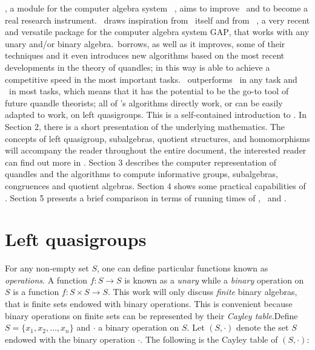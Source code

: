 \documentclass{mcom-l}
\begin{document}
\Software, a module for the computer algebra system \magma~\cite{BOSMA1997235}, aims to improve \rig~and to become a real research instrument. \Software~draws inspiration from \rig~itself and from \cream~\cite{Araujo2022CREAMAP}, a very recent and versatile package for the computer algebra system \textsc{GAP}, that works with any unary and/or binary algebra.\newline \Software~borrows, as well as it improves, some of their techniques and it even introduces new algorithms based on the most recent developments in the theory of quandles; in this way is able to achieve a competitive speed in the most important tasks. \Software~outperforms \rig~in any task and \cream~in most tasks, which means that it has the potential to be the go-to tool of future quandle theorists; all of \Software's algorithms directly work, or can be easily adapted to work, on left quasigroups. \newline This is a self-contained introduction to \Software. In Section 2, there is a short presentation of the underlying mathematics. The concepts of left quasigroup, subalgebras, quotient structures, and homomorphisms will accompany the reader throughout the entire document, the interested reader can find out more in \cite{burris1981course, elhamdadi2015quandles, phdStanov}. Section 3 describes the computer representation of quandles and the algorithms to compute informative groups, subalgebras, congruences and quotient algebras. Section 4 shows some practical capabilities of \Software. Section 5 presents a brief comparison in terms of running times of \Software, \rig~and \cream. 


\section{Left quasigroups}\label{introlqg}
\noindent For any non-empty set $S$, one can define particular functions known as \emph{operations}. A function $f : S \to S$ is known as a \emph{unary} while a \emph{binary} operation on $S$ is a function $f : S\times S \to S$.\newline
\noindent This work will only discuss \emph{finite} binary algebras, that is finite sets endowed with binary operations. This is convenient  because binary operations on finite sets can be represented by their \emph{Cayley table}.\newline Define $S= \{x_1, x_2, \dots, x_n\}$ and $\cdot$ a binary operation on $S$. \newline Let $(S, \cdot)$ denote the set $S$ endowed with the binary operation $\cdot$. \newline The following is the Cayley table of $(S, \cdot)$:\newline 
    
\end{document}
